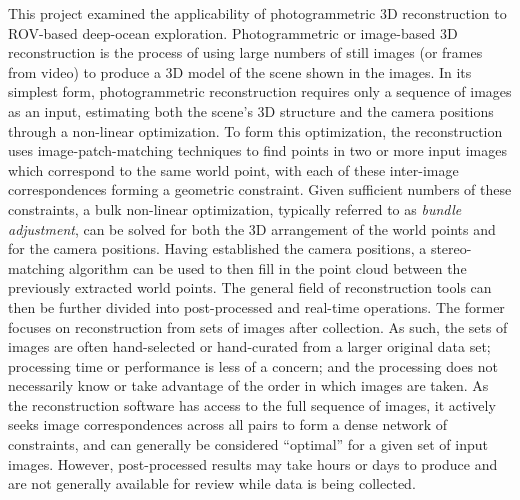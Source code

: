 \documentclass[letterpaper,12pt]{article}
\begin{document}
This project examined the applicability of photogrammetric 3D reconstruction to ROV-based deep-ocean exploration.   Photogrammetric or image-based 3D reconstruction is the process of using large numbers of still images (or frames from video) to produce a 3D model of the scene shown in the images.   In its simplest form, photogrammetric reconstruction requires only a sequence of images as an input, estimating both the scene's 3D structure and the camera positions through a non-linear optimization.   To form this optimization, the reconstruction uses image-patch-matching techniques to find points in two or more input images which correspond to the same world point, with each of these inter-image correspondences forming a geometric constraint.   Given sufficient numbers of these constraints, a bulk non-linear optimization, typically referred to as \textit{bundle adjustment}, can be solved for both the 3D arrangement of the world points and for the camera positions.  Having established the camera positions, a stereo-matching algorithm can be used to then fill in the point cloud between the previously extracted world points.  The general field of reconstruction tools can then be further divided into post-processed and real-time operations.   The former focuses on reconstruction from sets of images after collection.  As such, the sets of images are often hand-selected or hand-curated from a larger original data set; processing time or performance is less of a concern; and the processing does not necessarily know or take advantage of the order in which images are taken.   As the reconstruction software has access to the full sequence of images, it actively seeks image correspondences across all pairs to form a dense network of constraints, and can generally be considered ``optimal'' for a given set of input images.   However, post-processed results may take hours or days to produce and are not generally available for review while data is being collected.
\end{document}
